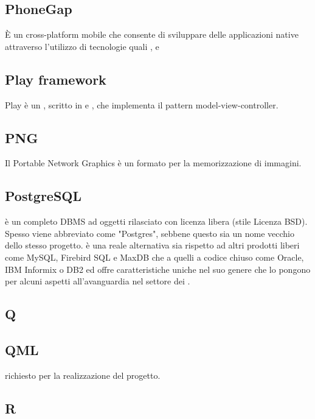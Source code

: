 \subsection*{PhoneGap}
È un  cross-platform mobile che consente di sviluppare delle applicazioni native attraverso l'utilizzo di tecnologie  quali ,  e 

\subsection*{Play framework}
Play è un  , scritto in  e , che implementa il pattern model-view-controller.

\subsection*{PNG}
Il Portable Network Graphics è un formato per la memorizzazione di immagini.

\subsection*{PostgreSQL}
 è un completo DBMS ad oggetti rilasciato con licenza libera (stile Licenza BSD). Spesso viene abbreviato come "Postgres", sebbene questo sia un nome vecchio dello stesso progetto.  è una reale alternativa sia rispetto ad altri prodotti liberi come MySQL, Firebird SQL e MaxDB che a quelli a codice chiuso come Oracle, IBM Informix o DB2 ed offre caratteristiche uniche nel suo genere che lo pongono per alcuni aspetti all'avanguardia nel settore dei .

\newpage

\begin{center}
\Huge\section*{\uppercase{Q}}
\end{center}

\subsection*{QML}
 richiesto per la realizzazione del progetto.

\newpage

\begin{center}
\Huge\section*{\uppercase{R}}
\end{center}


